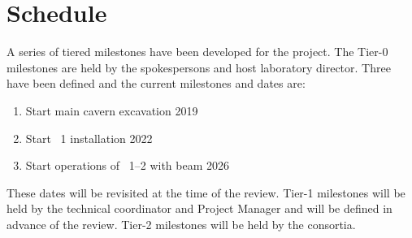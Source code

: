 \section{Schedule}
\label{sec:fdsp-coord-controls}

A series of tiered milestones have been developed for the 
project. The Tier-0 milestones are held by the spokespersons and host
laboratory director. Three have been defined and the current milestones and
dates are:
\begin{enumerate}
\item Start main cavern excavation \hspace{2.58in} 2019
\item Start ~1 installation \hspace{2.1in} 2022
\item Start operations of ~1--2 with beam \hspace{1in} 2026
\end{enumerate}
These dates will be revisited at the time of the  review.  Tier-1
milestones will be held by the technical coordinator and  Project
Manager and will be defined in advance of the  review. Tier-2
milestones will be held by the consortia.

